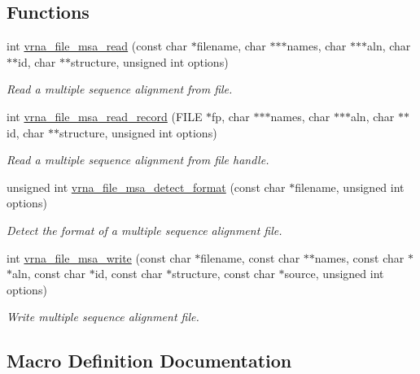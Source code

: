 \subsection*{Functions}
\begin{DoxyCompactItemize}
\item 
int \hyperlink{group__file__formats__msa_ga08a01c40ac5f5e0e04e9ae2258c99aa6}{vrna\+\_\+file\+\_\+msa\+\_\+read} (const char $\ast$filename, char $\ast$$\ast$$\ast$names, char $\ast$$\ast$$\ast$aln, char $\ast$$\ast$id, char $\ast$$\ast$structure, unsigned int options)
\begin{DoxyCompactList}\small\item\em Read a multiple sequence alignment from file. \end{DoxyCompactList}\item 
int \hyperlink{group__file__formats__msa_ga59204cd1daa4927f5127cc65a2886efd}{vrna\+\_\+file\+\_\+msa\+\_\+read\+\_\+record} (F\+I\+LE $\ast$fp, char $\ast$$\ast$$\ast$names, char $\ast$$\ast$$\ast$aln, char $\ast$$\ast$id, char $\ast$$\ast$structure, unsigned int options)
\begin{DoxyCompactList}\small\item\em Read a multiple sequence alignment from file handle. \end{DoxyCompactList}\item 
unsigned int \hyperlink{group__file__formats__msa_ga627ac281b5f11c63861726e6472626c9}{vrna\+\_\+file\+\_\+msa\+\_\+detect\+\_\+format} (const char $\ast$filename, unsigned int options)
\begin{DoxyCompactList}\small\item\em Detect the format of a multiple sequence alignment file. \end{DoxyCompactList}\item 
int \hyperlink{group__file__formats__msa_ga0c90faf1515ce0b16620036b1055ff1e}{vrna\+\_\+file\+\_\+msa\+\_\+write} (const char $\ast$filename, const char $\ast$$\ast$names, const char $\ast$$\ast$aln, const char $\ast$id, const char $\ast$structure, const char $\ast$source, unsigned int options)
\begin{DoxyCompactList}\small\item\em Write multiple sequence alignment file. \end{DoxyCompactList}\end{DoxyCompactItemize}


\subsection{Macro Definition Documentation}
\mbox{\label{group__file__formats__msa_ga79a23de2c7249f2cccd762e475c81859}} 
